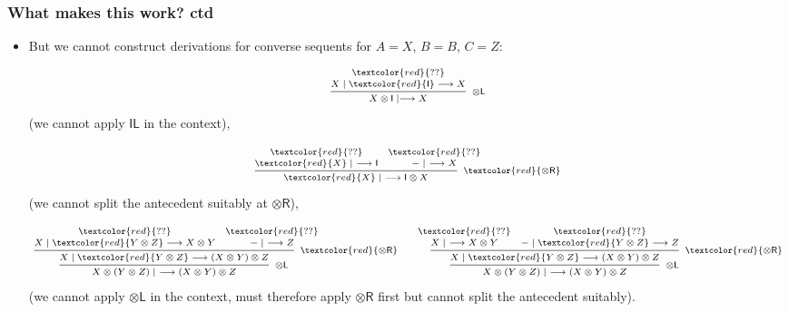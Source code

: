\documentclass[10pt,t]{beamer}
\newcommand{\red}[1]{\textcolor{red}{#1}}
\newcommand{\I}{\mathsf{I}}
\newcommand{\ot}{\otimes}
\newcommand{\n}{{-}}
\newcommand{\IL}{\I\mathsf{L}}
\newcommand{\otL}{\ot\mathsf{L}}
\newcommand{\otR}{\ot\mathsf{R}}
\renewcommand{\vdash}{\longrightarrow}
\begin{document}
\begin{frame}

\frametitle{What makes this work? ctd}

\begin{itemize}

\item But we cannot construct derivations for converse sequents for
  $A = X$, $B = B$, $C = Z$:

\[
\scriptsize
\infer[\otL]{X \ot \I \mid \vdash X}{
  \deduce{X \mid \red{\I} \vdash X}{
    \red{??}
  }
}
\]
(we cannot apply $\IL$ in the context),

\medskip

\[
\scriptsize
\infer[\red{\otR}]{\red{X} \mid ~\vdash \I \ot X}{
  \deduce[\red{??}]{\red{X} \mid ~ \vdash \I}{
  }
  &
  \deduce[\red{??}]{\n \mid ~ \vdash X}{
  }
}
\]
(we cannot split the antecedent suitably at $\otR$),

\medskip

\[
\scriptsize
\infer[\otL]{X \ot (Y \ot Z) \mid ~\vdash (X \ot Y) \ot Z}{
  \infer[\red{\otR}]{X \mid \red{Y \ot Z} \vdash (X \ot Y) \ot Z}{
   \deduce[\red{??}]{X \mid \red{Y \ot Z} \vdash X \ot Y}{
   }
   &
   \deduce[\red{??}]{\n \mid ~ \vdash  Z}{
   }
 }
}
\qquad
\infer[\otL]{X \ot (Y \ot Z) \mid ~ \vdash (X \ot Y) \ot Z}{
  \infer[\red{\otR}]{X \mid \red{Y \ot Z} \vdash (X \ot Y) \ot Z}{
   \deduce[\red{??}]{X \mid ~ \vdash X \ot Y}{
   }
   &
   \deduce[\red{??}]{\n \mid \red{Y \ot Z} \vdash Z}{
   }
 }
}
\]
(we cannot apply $\otL$ in the context, must therefore apply $\otR$
first but cannot split the antecedent suitably).

\end{itemize}

\end{frame}
\end{document}
